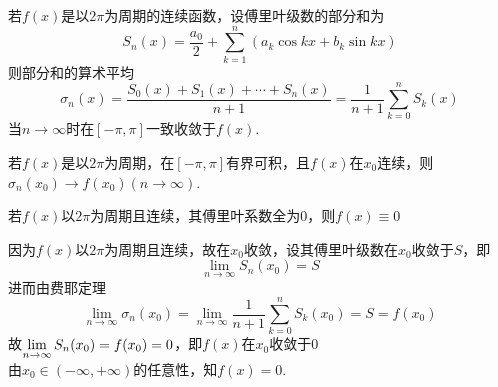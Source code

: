 \begin{theorem}[费耶(Fejer)]
若$f(x)$是以$2\pi$为周期的连续函数，设傅里叶级数的部分和为
\[S_n(x)=\dfrac{a_0}{2}+\sum_{k=1}^n(a_k\cos kx+b_k\sin kx)\]
则部分和的算术平均
\[\sigma_n(x)=\dfrac{S_0(x)+S_1(x)+\cdots+S_n(x)}{n+1}=\dfrac{1}{n+1}\sum_{k=0}^nS_k(x)\]
当$n\to\infty$时在$[-\pi,\pi]$一致收敛于$f(x)$.
\end{theorem}
\begin{corollary2}
若$f(x)$是以$2\pi$为周期，在$[-\pi,\pi]$有界可积，且$f(x)$在$x_0$连续，则$\sigma_n(x_0)\to f(x_0)(n\to\infty)$.
\end{corollary2}
\begin{example}
若$f(x)$以$2\pi$为周期且连续，其傅里叶系数全为$0$，则$f(x)\equiv 0$
\end{example}
\begin{analysis}
因为$f(x)$以$2\pi$为周期且连续，故在$x_0$收敛，设其傅里叶级数在$x_0$收敛于$S$，即
\[\lim_{n\to\infty}S_n(x_0)=S\]
进而由费耶定理
\[\lim_{n\to\infty}\sigma_n(x_0)=\lim_{n\to\infty}\dfrac{1}{n+1}\sum_{k=0}^nS_k(x_0)=S=f(x_0)\]
故$\displaystyle\lim_{n\to\infty}S_n(x_0)=f(x_0)=0$，即$f(x)$在$x_0$收敛于$0$\\
由$x_0\in(-\infty,+\infty)$的任意性，知$f(x)=0$.
\end{analysis}
